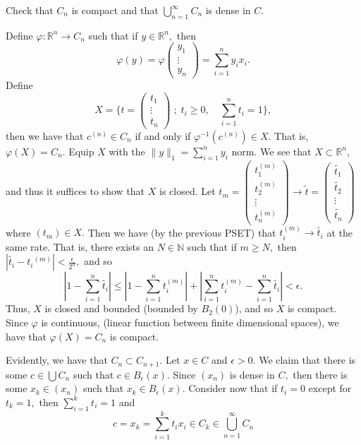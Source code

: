 \documentclass[11pt]{article}
\newcommand{\bbN}{\mathbb{N}}
\newcommand{\bbR}{\mathbb{R}}
\begin{document}
\begin{problem}
\begin{enumerate}
\begin{problem}
\begin{enumerate}
    Check that \( C_n \) is compact and that \( \bigcup_{n=1}^\infty C_n \) is dense in \( C \).
\begin{solution}
    Define $\varphi: \bbR^n \to C_n$ such that if $y\in \bbR^n,$ then \[\varphi(y) = \varphi\begin{pmatrix}
        y_1 \\\vdots \\y_n
    \end{pmatrix} = \sum_{i=1}^n y_i x_i.\] Define \[X = \{t = \begin{pmatrix}
        t_1 \\\vdots\\t_n
    \end{pmatrix}\; ; \; t_i \geq 0, \quad \sum_{i=1}^n t_i = 1\},\] then we have that $c^{(n)}\in C_n$ if and only if $\varphi^{-1}(c^{(n)})\in X.$ That is, $\varphi(X) = C_n.$ Equip $X$ with the $\|y\|_1 = \sum_{i=1}^n y_i$ norm. We see that $X\subset \bbR^n,$ and thus it suffices to show that $X$ is closed. Let $t_m = \begin{pmatrix}
        t_1^{(m)}\\t_2^{(m)}\\\vdots \\t_n^{(m)}
    \end{pmatrix} \to \tilde{t} = \begin{pmatrix}
        \tilde{t_1}\\ \tilde{t_2} \\ \vdots \\\tilde{t_n}
    \end{pmatrix}$ where $(t_m)\in X.$ Then we have (by the previous PSET) that $t_i^{(m)} \to \tilde{t_i}$ at the same rate. That is, there exists an $N\in \bbN$ such that if $m \geq N,$ then 
    $|\tilde{t_i} - {t_i}^{(m)}| < \frac{\epsilon}{2^n},$ and so
    \[|1 - \sum_{i=1}^n \tilde{t_i}| \leq |1 - \sum_{i=1}^n t_i^{(m)}| + |\sum_{i=1}^n t_i^{(m)} - \sum_{i=1}^n \tilde{t_i}| < \epsilon.\] Thus, $X$ is closed and bounded (bounded by $B_2(0)$), and so $X$ is compact. Since $\varphi$ is continuous, (linear function between finite dimensional spaces), we have that $\varphi(X) = C_n$ is compact. 
    
    
    Evidently, we have that $C_n \subset C_{n+1}.$ Let $x\in C$ and $\epsilon>0.$ We claim that there is some $c \in \bigcup C_n$ such that $c\in B_\epsilon(x).$ Since $(x_n)$ is dense in $C,$ then there is some $x_k \in (x_n)$ such that $x_k \in B_\epsilon(x).$ Consider now that if $t_i = 0$ except for $t_k = 1,$ then $\sum_{i=1}^k t_i = 1$ and  \[c = x_k = \sum_{i=1}^k t_i x_i \in C_k \in \bigcup_{n=1}^\infty C_n\] 
\end{solution}


\end{enumerate}
\end{problem}
\end{enumerate}
\end{problem}
\end{document}
